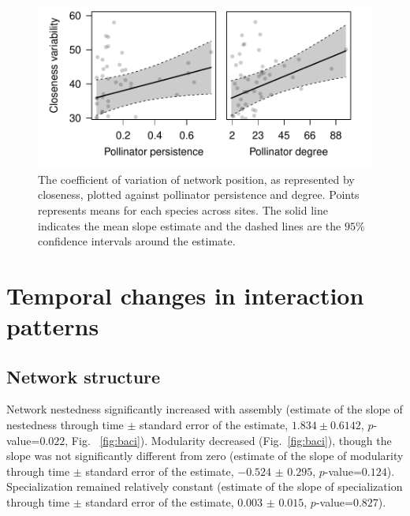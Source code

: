\documentclass[12pt]{article}
\begin{document}
\begin{figure}
  \centering
  \includegraphics[width=.8\textwidth]{../analysis/variability/figures/cv/occ_degree.pdf}
  \caption{The coefficient of variation of network position, as
    represented by closeness, plotted against pollinator persistence
    and degree. Points represents means for each species across sites.
    The solid line indicates the mean slope estimate and the dashed
    lines are the $95\%$ confidence intervals around the estimate. }
  \label{fig:cv}
\end{figure}
\clearpage

\section*{Temporal changes in interaction patterns}
\subsection*{Network structure}
Network nestedness significantly increased with assembly (estimate of
the slope of nestedness through time $\pm$ standard error of the
estimate, $1.834 \pm 0.6142$, $p$-value=$0.022$, Fig.~
\ref{fig:baci}).  Modularity decreased (Fig.~\ref{fig:baci}), though
the slope was not significantly different from zero (estimate of the
slope of modularity through time $\pm$ standard error of the estimate,
$-0.524$ $\pm$ $0.295$, $p$-value=$0.124$). Specialization remained
relatively constant (estimate of the slope of specialization through time
$\pm$ standard error of the estimate, $0.003$ $\pm$ $0.015$,
$p$-value=$0.827$).
\end{document}

